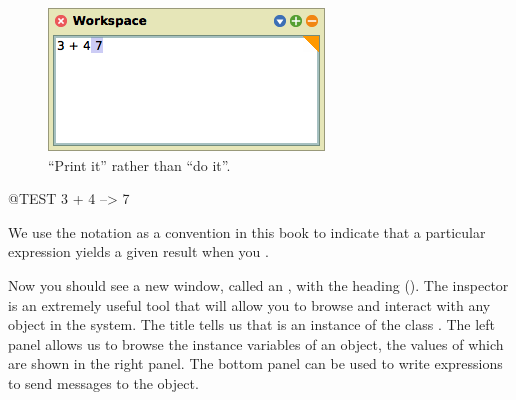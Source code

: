 \documentclass[a4paper,10pt,twoside]{book}
\begin{document}
\begin{figure}[htb]
\centerline {\includegraphics[scale=0.65]{PrintIt}}
\caption{``Print it'' rather than ``do it''. \label{fig:printit}}
\end{figure}

\begin{code}{@TEST}
3 + 4 --> 7
\end{code}
\noindent
We use the notation \ct{-->} as a convention in this book to indicate that a particular \sq expression yields a given result when you .

\noindent
Now you should see a new window, called an , with the heading  ().
The inspector is an extremely useful tool that will allow you to browse and interact with any object in the system.
The title tells us that  is an instance of the class .
The left panel allows us to browse the instance variables of an object, the values of which are shown in the right panel.
The bottom panel can be used to write expressions to send messages to the object.
\end{document}
